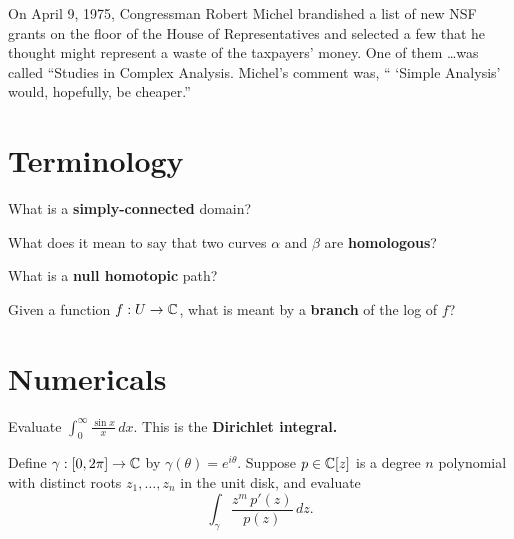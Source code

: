 \documentclass{homework}
\author{Jim Fowler}
\begin{document}
\maketitle

\begin{inspiration}
  On April 9, 1975, Congressman Robert Michel brandished a list of new
  NSF grants on the floor of the House of Representatives and selected
  a few that he thought might represent a waste of the taxpayers'
  money. One of them \ldots was called ``Studies in Complex
  Analysis. Michel's comment was, `` `Simple Analysis' would,
  hopefully, be cheaper.''
\end{inspiration}

\section{Terminology}

\begin{problem}
  What is a \textbf{simply-connected} domain?
\end{problem}

\begin{problem}
  What does it mean to say that two curves $\alpha$ and $\beta$ are
  \textbf{homologous}?
\end{problem}

\begin{problem}
  What is a \textbf{null homotopic} path?
\end{problem}

\begin{problem}
  Given a function $f : U \to \mathbb{C}$, what is meant by a \textbf{branch} of the log of $f$?
\end{problem}

\section{Numericals}

\begin{problem}
  Evaluate $\int_0^\infty \frac{\sin x}{x} \, dx$.  This is the
  \textbf{Dirichlet integral.}
\end{problem}

\begin{problem}
  Define $\gamma : [0,2\pi] \to \mathbb{C}$ by $\gamma(\theta) = e^{i\theta}$.
  Suppose $p \in \mathbb{C}[z]$ is a degree $n$ polynomial with distinct roots
  $z_1,\ldots,z_n$ in the unit disk, and evaluate
  \[
    \int_\gamma \frac{z^m \, p'(z)}{p(z)} \, dz.
  \]
\end{problem}
\end{document}
